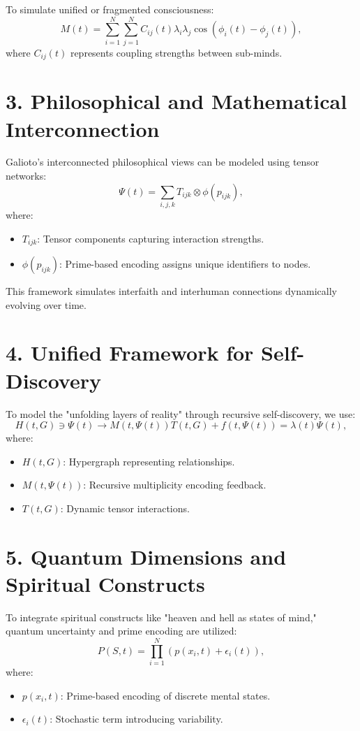 \documentclass{article}
\theoremstyle{plain}
\theoremstyle{definition}
\begin{document}
To simulate unified or fragmented consciousness:
\begin{equation}
    M(t) = \sum_{i=1}^N \sum_{j=1}^N C_{ij}(t) \lambda_i \lambda_j \cos(\phi_i(t) - \phi_j(t)),
\end{equation}
where $C_{ij}(t)$ represents coupling strengths between sub-minds.

\section*{3. Philosophical and Mathematical Interconnection}
Galioto’s interconnected philosophical views can be modeled using tensor networks:
\begin{equation}
    \Psi(t) = \sum_{i,j,k} T_{ijk} \otimes \phi(p_{ijk}),
\end{equation}
where:
\begin{itemize}
    \item $T_{ijk}$: Tensor components capturing interaction strengths.
    \item $\phi(p_{ijk})$: Prime-based encoding assigns unique identifiers to nodes.
\end{itemize}

This framework simulates interfaith and interhuman connections dynamically evolving over time.

\section*{4. Unified Framework for Self-Discovery}
To model the "unfolding layers of reality" through recursive self-discovery, we use:
\begin{equation}
    H(t, G) \ni \Psi(t) \to M(t, \Psi(t))T(t, G) + f(t, \Psi(t)) = \lambda(t) \Psi(t),
\end{equation}
where:
\begin{itemize}
    \item $H(t, G)$: Hypergraph representing relationships.
    \item $M(t, \Psi(t))$: Recursive multiplicity encoding feedback.
    \item $T(t, G)$: Dynamic tensor interactions.
\end{itemize}

\section*{5. Quantum Dimensions and Spiritual Constructs}
To integrate spiritual constructs like "heaven and hell as states of mind," quantum uncertainty and prime encoding are utilized:
\begin{equation}
    P(S, t) = \prod_{i=1}^N \left( p(x_i, t) + \epsilon_i(t) \right),
\end{equation}
where:
\begin{itemize}
    \item $p(x_i, t)$: Prime-based encoding of discrete mental states.
    \item $\epsilon_i(t)$: Stochastic term introducing variability.
\end{itemize}
\end{document}
